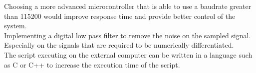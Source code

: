 Choosing a more advanced microcontroller that is able to use a baudrate greater than 115200 would improve response time and provide better control of the system.\\

Implementing a digital low pass filter to remove the noise on the sampled signal. Especially on the signals that are required to be numerically differentiated.\\

The script executing on the external computer can be written in a language such as C or C++ to increase the execution time of the script.\\


\newpage

	